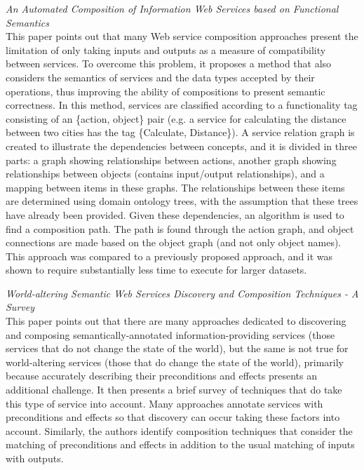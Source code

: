 \textit{An Automated Composition of Information Web Services based on Functional Semantics \cite{shin2007automated}}\\
This paper points out that many Web service composition approaches present the limitation of only taking inputs and
outputs as a measure of compatibility between services. To overcome this problem, it proposes a method that also
considers the semantics of services and the data types accepted by their operations, thus improving the ability of
compositions to present semantic correctness. In this method, services are classified according to a functionality
tag consisting of an \{action, object\} pair (e.g. a service for calculating the distance between two cities has
the tag \{Calculate, Distance\}). A service relation graph is created to illustrate the dependencies between concepts,
and it is divided in three parts: a graph showing relationships between actions, another graph showing relationships
between objects (contains input/output relationships), and a mapping between items in these graphs. The relationships
between these items are determined using domain ontology trees, with the assumption that these trees have already
been provided. Given these dependencies, an algorithm is used to find a composition path. The path is found through
the action graph, and object connections are made based on the object graph (and not only object names). This approach
was compared to a previously proposed approach, and it was shown to require substantially less time to execute for
larger datasets.

\textit{World-altering Semantic Web Services Discovery and Composition Techniques - A Survey \cite{saboohi2011world}}\\
This paper points out that there are many approaches dedicated to discovering and composing semantically-annotated information-providing
services (those services that do not change the state of the world), but the same is not true for world-altering services (those that do
change the state of the world), primarily because accurately describing their preconditions and effects presents an additional challenge.
It then presents a brief survey of techniques that do take this type of service into account. Many approaches annotate services with
preconditions and effects so that discovery can occur taking these factors into account. Similarly, the authors identify composition
techniques that consider the matching of preconditions and effects in addition to the usual matching of inputs with outputs.

